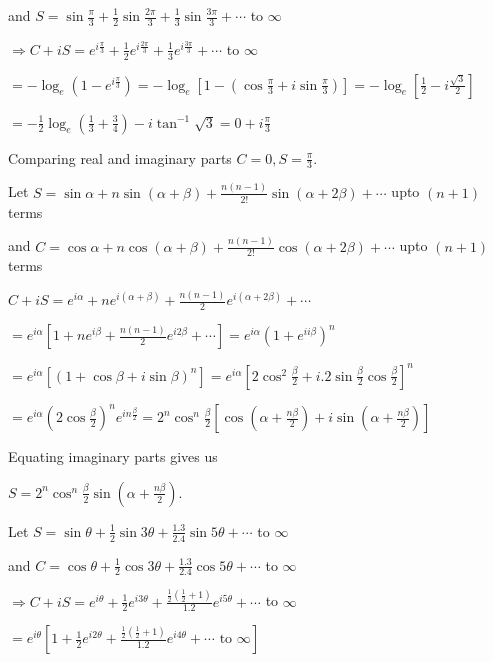   and $S = \sin\frac{\pi}{3} + \frac{1}{2}\sin\frac{2\pi}{3} + \frac{1}{3}\sin\frac{3\pi}{3} + \cdots$ to
  $\infty$

  $\Rightarrow C + iS = e^{i\frac{\pi}{3}} + \frac{1}{2}e^{i\frac{2\pi}{3}} + \frac{1}{3}e^{i\frac{3\pi}{3}}
  + \cdots$ to $\infty$

  $= -\log_e\left(1 - e^{i\frac{\pi}{3}}\right) = -\log_e\left[1 - \left(\cos\frac{\pi}{3} +
    i\sin\frac{\pi}{3}\right)\right] = -\log_e\left[\frac{1}{2} - i\frac{\sqrt{3}}{2}\right]$

  $= -\frac{1}{2}\log_e\left(\frac{1}{3} + \frac{3}{4}\right) -i\tan^{-1}\sqrt{3} = 0 + i\frac{\pi}{3}$

  Comparing real and imaginary parts $C = 0, S = \frac{\pi}{3}$.
\item Let $S = \sin\alpha + n\sin(\alpha + \beta) + \frac{n(n - 1)}{2!}\sin(\alpha + 2\beta) + \cdots$ upto
  $(n + 1)$ terms

  and $C = \cos\alpha + n\cos(\alpha + \beta) + \frac{n(n - 1)}{2!}\cos(\alpha + 2\beta) + \cdots$ upto $(n
  + 1)$ terms

  $C + iS = e^{i\alpha} + ne^{i(\alpha + \beta)} + \frac{n(n - 1)}{2}e^{i(\alpha + 2\beta)} + \cdots$

  $= e^{i\alpha}\left[1 + ne^{i\beta} + \frac{n(n - 1)}{2}e^{i2\beta} + \cdots\right] = e^{i\alpha}\left(1 +
  e^{ii\beta}\right)^n$

  $= e^{i\alpha}\left[\left(1 + \cos\beta + i\sin\beta\right)^n\right] =
  e^{i\alpha}\left[2\cos^2\frac{\beta}{2} + i.2\sin\frac{\beta}{2}\cos\frac{\beta}{2}\right]^n$

  $= e^{i\alpha}\left(2\cos\frac{\beta}{2}\right)^ne^{in\frac{\beta}{2}} =
  2^n\cos^n\frac{\beta}{2}\left[\cos\left(\alpha + \frac{n\beta}{2}\right) + i\sin\left(\alpha +
    \frac{n\beta}{2}\right)\right]$

  Equating imaginary parts gives us

  $S = 2^n\cos^n\frac{\beta}{2}\sin\left(\alpha + \frac{n\beta}{2}\right)$.
\item Let $S = \sin\theta + \frac{1}{2}\sin3\theta + \frac{1.3}{2.4}\sin5\theta + \cdots$
  to $\infty$

  and $C = \cos\theta + \frac{1}{2}\cos3\theta + \frac{1.3}{2.4}\cos5\theta + \cdots$
  to $\infty$

  $\Rightarrow C + iS = e^{i\theta} + \frac{1}{2}e^{i3\theta} + \frac{\frac{1}{2}\left(\frac{1}{2} +
    1\right)}{1.2}e^{i5\theta} + \cdots$ to $\infty$

  $= e^{i\theta}\left[1 + \frac{1}{2}e^{i2\theta} + \frac{\frac{1}{2}\left(\frac{1}{2} +
      1\right)}{1.2}e^{i4\theta} + \cdots \text{ to } \infty\right]$

